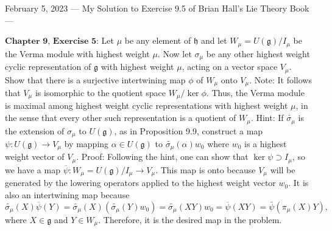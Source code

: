 February 5, 2023
---
My Solution to Exercise 9.5 of Brian Hall's Lie Theory Book
---

$\textbf{Chapter 9, Exercise 5:}$ Let $\mu$ be any element of $\mathfrak{h}$ and let $W_\mu = U(\mathfrak{g})/I_\mu$ be the Verma module with highest weight $\mu$. 
Now let $\sigma_\mu$ be any other highest weight cyclic representation of $\mathfrak{g}$ with highest weight $\mu$, acting on a vector space $V_\mu$. 
Show that there is a surjective intertwining map $\phi$ of $W_\mu$ onto $V_\mu$.
Note: It follows that $V_\mu$ is isomorphic to the quotient space $W_\mu/\ker \phi$. Thus, the Verma module is maximal among highest weight cyclic representations with highest weight $\mu$, in the sense that every other such representation is a quotient of $W_\mu.$
Hint: If $\tilde{\sigma_\mu}$ is the extension of $\sigma_\mu$ to $U(\mathfrak{g})$, as in Proposition 9.9, construct a map $\psi: U(\mathfrak{g}) \to V_\mu$ by mapping $\alpha \in U(\mathfrak{g})$ to $\tilde{\sigma_\mu}(\alpha)w_0$ where $w_0$ is a highest weight vector of $V_\mu$.
Proof: Following the hint, one can show that $\ker \psi \supset I_\mu$, so we have a map $\overline{\psi}:W_\mu = U(\mathfrak{g})/I_\mu \to V_\mu.$ This map is onto because $V_\mu$ will be generated by the lowering operators applied to the highest weight vector $w_0$. It is also an intertwining map because $$\tilde{\sigma_\mu}(X)\overline{\psi}(Y) = \tilde{\sigma_\mu}(X)(\tilde{\sigma_\mu}(Y)w_0) = \tilde{\sigma_\mu}(XY)w_0 = \overline{\psi}(XY) = \bar{\psi}(\pi_\mu(X)Y),$$
where $X\in \mathfrak{g}$ and $Y\in W_\mu$. Therefore, it is the desired map in the problem.